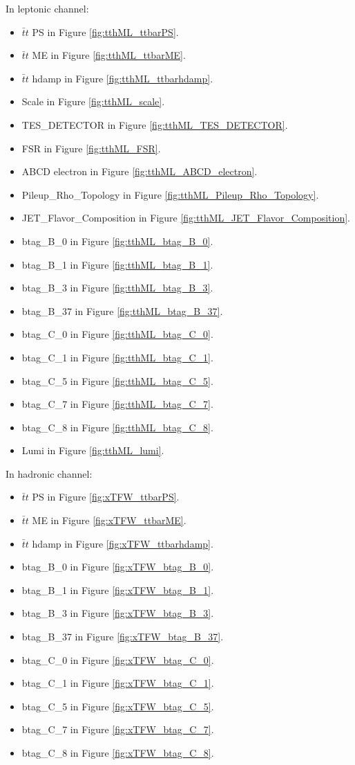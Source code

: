 In leptonic channel:
\begin{itemize}
	\item $\bar{t}t$ PS in Figure \ref{fig:tthML_ttbarPS}.
	\item $\bar{t}t$ ME in Figure \ref{fig:tthML_ttbarME}.
	\item $\bar{t}t$ hdamp in Figure \ref{fig:tthML_ttbarhdamp}.
	\item Scale in Figure \ref{fig:tthML_scale}.
	\item TES\_DETECTOR in Figure \ref{fig:tthML_TES_DETECTOR}.
	\item FSR in Figure \ref{fig:tthML_FSR}.
	\item ABCD electron in Figure \ref{fig:tthML_ABCD_electron}.
	\item Pileup\_Rho\_Topology in Figure \ref{fig:tthML_Pileup_Rho_Topology}.
	\item JET\_Flavor\_Composition in Figure \ref{fig:tthML_JET_Flavor_Composition}.
	\item btag\_B\_0 in Figure \ref{fig:tthML_btag_B_0}.
	\item btag\_B\_1 in Figure \ref{fig:tthML_btag_B_1}.
	\item btag\_B\_3 in Figure \ref{fig:tthML_btag_B_3}.
	\item btag\_B\_37 in Figure \ref{fig:tthML_btag_B_37}.
	\item btag\_C\_0 in Figure \ref{fig:tthML_btag_C_0}.
	\item btag\_C\_1 in Figure \ref{fig:tthML_btag_C_1}.
	\item btag\_C\_5 in Figure \ref{fig:tthML_btag_C_5}.
	\item btag\_C\_7 in Figure \ref{fig:tthML_btag_C_7}.
	\item btag\_C\_8 in Figure \ref{fig:tthML_btag_C_8}.
	\item Lumi in Figure \ref{fig:tthML_lumi}.

\end{itemize}

In hadronic channel:
\begin{itemize}
	\item $\bar{t}t$ PS in Figure \ref{fig:xTFW_ttbarPS}.
	\item $\bar{t}t$ ME in Figure \ref{fig:xTFW_ttbarME}.
	\item $\bar{t}t$ hdamp in Figure \ref{fig:xTFW_ttbarhdamp}.
	\item btag\_B\_0 in Figure \ref{fig:xTFW_btag_B_0}.
	\item btag\_B\_1 in Figure \ref{fig:xTFW_btag_B_1}.
	\item btag\_B\_3 in Figure \ref{fig:xTFW_btag_B_3}.
	\item btag\_B\_37 in Figure \ref{fig:xTFW_btag_B_37}.
	\item btag\_C\_0 in Figure \ref{fig:xTFW_btag_C_0}.
	\item btag\_C\_1 in Figure \ref{fig:xTFW_btag_C_1}.
	\item btag\_C\_5 in Figure \ref{fig:xTFW_btag_C_5}.
	\item btag\_C\_7 in Figure \ref{fig:xTFW_btag_C_7}.
	\item btag\_C\_8 in Figure \ref{fig:xTFW_btag_C_8}.
\end{itemize}

